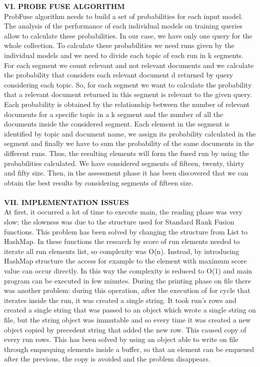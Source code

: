 \documentclass[12pt,journal]{IEEEtran}
\begin{document}
\textbf{VI.	PROBE FUSE ALGORITHM} \\
ProbFuse algorithm needs to build a set of probabilities for each input model. 
The analysis of the performance of each individual models on training queries allow to calculate these probabilities. 
In our case, we have only one query for the whole collection.
To calculate these probabilities we need runs given by the individual models and we need to divide each topic of each run in k segments. For each segment we count relevant and not relevant documents and we calculate the probability that considers each relevant document d returned by query considering each topic. 
So, for each segment we want to calculate the probability that a relevant document returned in this segment is relevant to the given query. Each probability is obtained by the relationship between the number of relevant documents for a specific topic in a k segment and the number of all the documents inside the considered segment.
Each element in the segment is identified by topic and document name, we assign its probability calculated in the segment and finally we have to sum the probability of the same documents in the different runs.
Thus, the resulting elements will form the fused run by using the probabilities calculated. 
We have considered segments of fifteen, twenty, thirty and fifty size. Then, in the assessment phase it has been discovered that we can obtain the best results by considering segments of fifteen size. \\ \\
\textbf{VII. IMPLEMENTATION ISSUES} \\
At first, it occurred a lot of time to execute main, the reading phase was very slow; the slowness was due to the structure used for Standard Rank Fusion functions. This problem has been solved by changing the structure from List to HashMap. 
In these functions the research by score of run elements needed to iterate all run elements list, so complexity was O(n). Instead, by introducing HashMap structure the access for example to the element with maximum score value can occur directly. In this way the complexity is reduced to O(1) and main program can be executed in few minutes. 
During the printing phase on file there was another problem: during this operation, after the execution of for cycle that iterates inside the run, it was created a single string. It took run’s rows and created a single string that was passed to an object which wrote a single string on file, but the string object was immutable and so every time it was created a new object copied by precedent string that added the new row. This caused copy of every run rows. This has been solved by using an object able to write on file through enquequing elements inside a buffer, so that an element can be enqueued after the previous, the copy is avoided and the problem disappears. \\
\end{document}
